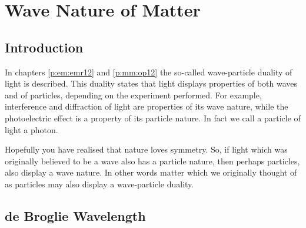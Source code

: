 \chapter{Wave Nature of Matter}
\label{p:wsl:wnm12}

\section{Introduction}

In chapters \ref{p:em:emr12} and \ref{p:mm:op12} the so-called wave-particle duality of light is described. This duality states that light displays properties of both waves and of particles, depending on the experiment performed. For example, interference and diffraction of light are properties of its  wave nature, while the photoelectric effect is a property of its particle nature. In fact we call a particle of light a photon.

Hopefully you have realised that nature loves symmetry. So, if light which was originally believed to be a wave also has a particle nature, then perhaps particles, also display a wave nature. In other words matter which we originally thought of as particles may also display a wave-particle duality.

\section{de Broglie Wavelength}

